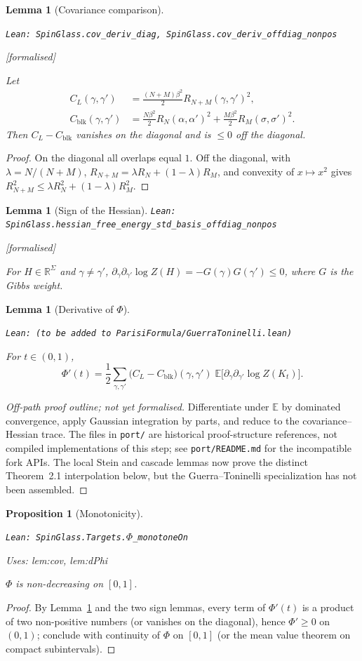 \documentclass[11pt]{article}
\providecommand{\lean}[1]{\leavevmode\par\nopagebreak
  {\noindent\normalfont\footnotesize\raggedright\texttt{Lean: #1}\par}\nopagebreak}
\providecommand{\leanok}{\par\nopagebreak
  {\noindent\normalfont\footnotesize\textcolor{green!50!black}{[formalised]}\par}\nopagebreak}
\providecommand{\uses}[1]{\par\nopagebreak
  {\noindent\normalfont\footnotesize Uses: #1\par}\nopagebreak}
\newtheorem{proposition}[theorem]{Proposition}
\newtheorem{lemma}[theorem]{Lemma}
\newcommand{\E}{\mathbb{E}}
\newcommand{\R}{\mathbb{R}}
\begin{document}
\begin{lemma}[Covariance comparison]\label{lem:cov}
\lean{SpinGlass.cov\_deriv\_diag, SpinGlass.cov\_deriv\_offdiag\_nonpos}\leanok
Let
\begin{align*}
C_L(\gamma,\gamma')&=\frac{(N+M)\beta^2}2R_{N+M}(\gamma,\gamma')^2,\\
C_{\mathrm{blk}}(\gamma,\gamma')&=\frac{N\beta^2}2R_N(\alpha,\alpha')^2
  +\frac{M\beta^2}2R_M(\sigma,\sigma')^2.
\end{align*}
Then $C_L-C_{\mathrm{blk}}$ vanishes on the diagonal and is $\le0$ off the diagonal.
\end{lemma}
\begin{proof}
On the diagonal all overlaps equal $1$. Off the diagonal, with $\lambda=N/(N+M)$,
$R_{N+M}=\lambda R_N+(1-\lambda)R_M$, and convexity of $x\mapsto x^2$ gives
$R_{N+M}^2\le\lambda R_N^2+(1-\lambda)R_M^2$.
\end{proof}

\begin{lemma}[Sign of the Hessian]
\lean{SpinGlass.hessian\_free\_energy\_std\_basis\_offdiag\_nonpos}\leanok
For $H\in\R^{\Sigma}$ and $\gamma\ne\gamma'$, $\partial_\gamma\partial_{\gamma'}\log Z(H)=-G(\gamma)G(\gamma')\le0$,
where $G$ is the Gibbs weight.
\end{lemma}

\begin{lemma}[Derivative of $\Phi$]\label{lem:dPhi}
\lean{(to be added to ParisiFormula/GuerraToninelli.lean)}
For $t\in(0,1)$,
\[
\Phi'(t)=\frac12\sum_{\gamma,\gamma'}\big(C_L-C_{\mathrm{blk}}\big)(\gamma,\gamma')\;
\E\big[\partial_\gamma\partial_{\gamma'}\log Z(K_t)\big].
\]
\end{lemma}
\begin{proof}[Off-path proof outline; not yet formalised]
Differentiate under $\E$ by dominated convergence, apply Gaussian integration by
parts, and reduce to the covariance--Hessian trace. The files in \texttt{port/}
are historical proof-structure references, not compiled implementations of this
step; see \texttt{port/README.md} for the incompatible fork APIs. The local Stein
and cascade lemmas now prove the distinct Theorem~2.1 interpolation below, but
the Guerra--Toninelli specialization has not been assembled.
\end{proof}

\begin{proposition}[Monotonicity]\label{prop:mono}
\lean{SpinGlass.Targets.\ensuremath{\Phi}\_monotoneOn}
\uses{lem:cov, lem:dPhi}
$\Phi$ is non-decreasing on $[0,1]$.
\end{proposition}
\begin{proof}
By Lemma~\ref{lem:dPhi} and the two sign lemmas, every term of $\Phi'(t)$ is a product of
two non-positive numbers (or vanishes on the diagonal), hence $\Phi'\ge0$ on $(0,1)$;
conclude with continuity of $\Phi$ on $[0,1]$ (or the mean value theorem on compact
subintervals).
\end{proof}
\end{document}
